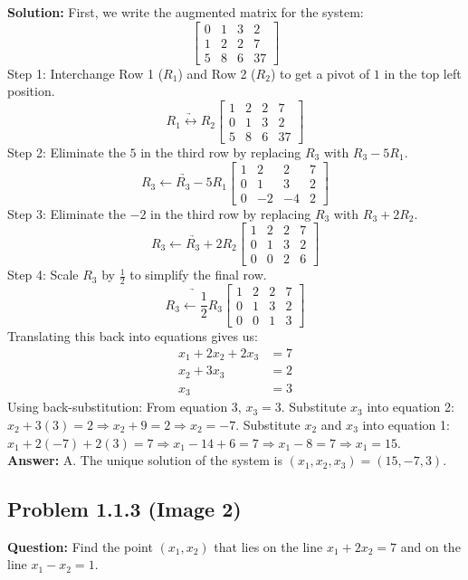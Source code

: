 \documentclass[11pt]{article}
\begin{document}
\textbf{Solution:}
First, we write the augmented matrix for the system:
\[
\begin{bmatrix}
0 & 1 & 3 & 2 \\
1 & 2 & 2 & 7 \\
5 & 8 & 6 & 37
\end{bmatrix}
\]
Step 1: Interchange Row 1 ($R_1$) and Row 2 ($R_2$) to get a pivot of $1$ in the top left position.
\[
\underrightarrow{R_1 \leftrightarrow R_2}
\begin{bmatrix}
1 & 2 & 2 & 7 \\
0 & 1 & 3 & 2 \\
5 & 8 & 6 & 37
\end{bmatrix}
\]
Step 2: Eliminate the $5$ in the third row by replacing $R_3$ with $R_3 - 5R_1$.
\[
\underrightarrow{R_3 \leftarrow R_3 - 5R_1}
\begin{bmatrix}
1 & 2 & 2 & 7 \\
0 & 1 & 3 & 2 \\
0 & -2 & -4 & 2
\end{bmatrix}
\]
Step 3: Eliminate the $-2$ in the third row by replacing $R_3$ with $R_3 + 2R_2$.
\[
\underrightarrow{R_3 \leftarrow R_3 + 2R_2}
\begin{bmatrix}
1 & 2 & 2 & 7 \\
0 & 1 & 3 & 2 \\
0 & 0 & 2 & 6
\end{bmatrix}
\]
Step 4: Scale $R_3$ by $\frac{1}{2}$ to simplify the final row.
\[
\underrightarrow{R_3 \leftarrow \frac{1}{2}R_3}
\begin{bmatrix}
1 & 2 & 2 & 7 \\
0 & 1 & 3 & 2 \\
0 & 0 & 1 & 3
\end{bmatrix}
\]
Translating this back into equations gives us:
\begin{align*}
    x_1 + 2x_2 + 2x_3 &= 7 \\
    x_2 + 3x_3 &= 2 \\
    x_3 &= 3
\end{align*}
Using back-substitution:
From equation 3, $x_3 = 3$.
Substitute $x_3$ into equation 2: $x_2 + 3(3) = 2 \Rightarrow x_2 + 9 = 2 \Rightarrow x_2 = -7$.
Substitute $x_2$ and $x_3$ into equation 1: $x_1 + 2(-7) + 2(3) = 7 \Rightarrow x_1 - 14 + 6 = 7 \Rightarrow x_1 - 8 = 7 \Rightarrow x_1 = 15$.
\\
\textbf{Answer:} A. The unique solution of the system is $(x_1, x_2, x_3) = (15, -7, 3)$.


\subsection*{Problem 1.1.3 (Image 2)}
\textbf{Question:} Find the point $(x_1, x_2)$ that lies on the line $x_1 + 2x_2 = 7$ and on the line $x_1 - x_2 = 1$.
\end{document}
